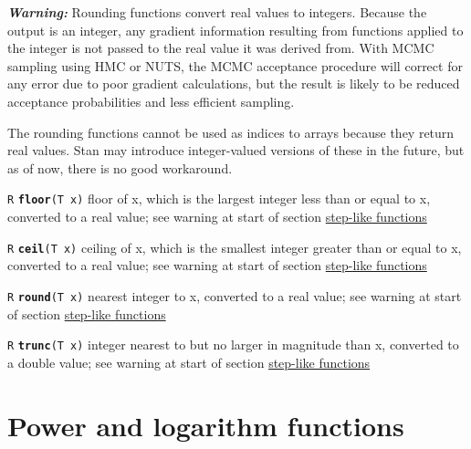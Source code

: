 \documentclass[
  10pt,
]{book}
\begin{document}
\emph{\textbf{Warning:}} Rounding functions convert real values to integers.
Because the output is an integer, any gradient information resulting
from functions applied to the integer is not passed to the real value
it was derived from. With MCMC sampling using HMC or NUTS, the MCMC
acceptance procedure will correct for any error due to poor gradient
calculations, but the result is likely to be reduced acceptance
probabilities and less efficient sampling.

The rounding functions cannot be used as indices to arrays because
they return real values. Stan may introduce integer-valued versions
of these in the future, but as of now, there is no good workaround.


\texttt{R} \textbf{\texttt{floor}}\texttt{(T\ x)}\newline
floor of x, which is the largest integer less than or equal to x,
converted to a real value; see warning at start of section
\protect\hyperlink{step-functions}{step-like functions}


\texttt{R} \textbf{\texttt{ceil}}\texttt{(T\ x)}\newline
ceiling of x, which is the smallest integer greater than or equal to
x, converted to a real value; see warning at start of section
\protect\hyperlink{step-functions}{step-like functions}


\texttt{R} \textbf{\texttt{round}}\texttt{(T\ x)}\newline
nearest integer to x, converted to a real value; see warning at start
of section \protect\hyperlink{step-functions}{step-like functions}


\texttt{R} \textbf{\texttt{trunc}}\texttt{(T\ x)}\newline
integer nearest to but no larger in magnitude than x, converted to a
double value; see warning at start of section \protect\hyperlink{step-functions}{step-like functions}

\hypertarget{power-and-logarithm-functions}{%
\section{Power and logarithm functions}\label{power-and-logarithm-functions}}
\end{document}
